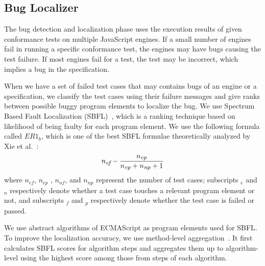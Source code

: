 \subsection{Bug Localizer}

The bug detection and localization phase uses the execution results of
given conformance tests on multiple JavaScript engines.
If a small number of engines fail in running a specific conformance test,
the engines may have bugs causing the test failure.
If most engines fail for a test, the test may be incorrect,
which implies a bug in the specification.

When we have a set of failed test cases that may contains bugs of an engine or a
specification, we classify the test cases using their failure
messages and give ranks between possible buggy program elements to localize the bug.
We use Spectrum Based Fault Localization (SBFL)~\cite{sbfl-survey},
which is a ranking technique based on likelihood of being faulty for each
program element.  We use the following formula called $ER1_b$,
which is one of the best SBFL formulae theoretically analyzed by Xie et al.~\cite{er1b}:
\[
  {n_{\mbox{\emph{\scriptsize ef}}}} -
  {
    {n_{\mbox{\emph{\scriptsize ep}}}}
    \over
    {n_{\mbox{\emph{\scriptsize ep}}} + n_{\mbox{\emph{\scriptsize np}}} + 1}
  }
\]
where $n_{ef}$, $n_{ep}$ , $n_{nf}$, and $n_{np}$ represent the number of test
cases; subscripts ${}_e$ and ${}_n$ respectively denote whether a test case touches a
relevant program element or not, and subscripts ${}_f$ and ${}_p$
respectively denote whether the test case is failed or passed.

We use abstract algorithms of ECMAScript as program elements used for SBFL.
To improve the localization accuracy, we use method-level aggregation~\cite{fluccs}.
It first calculates SBFL scores for algorithm steps and aggregates
them up to algorithm-level using the highest score among those from steps of each algorithm.
